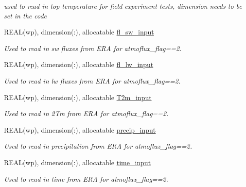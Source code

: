 \begin{DoxyCompactItemize}
\begin{DoxyCompactList}\small\item\em used to read in top temperature for field experiment tests, dimension needs to be set in the code \item\end{DoxyCompactList}\item 
REAL(wp), dimension(:), allocatable \hyperlink{namespacemo__data_adbae909d2ce614966d3de6ae1eb558a0}{fl\_\-sw\_\-input}
\begin{DoxyCompactList}\small\item\em Used to read in sw fluxes from ERA for atmoflux\_\-flag==2. \item\end{DoxyCompactList}\item 
REAL(wp), dimension(:), allocatable \hyperlink{namespacemo__data_a2d2ccb1188895b74eb3e2742c6a82b4c}{fl\_\-lw\_\-input}
\begin{DoxyCompactList}\small\item\em Used to read in lw fluxes from ERA for atmoflux\_\-flag==2. \item\end{DoxyCompactList}\item 
REAL(wp), dimension(:), allocatable \hyperlink{namespacemo__data_a8795a47a232696bffa9fa64a1f06a420}{T2m\_\-input}
\begin{DoxyCompactList}\small\item\em Used to read in 2Tm from ERA for atmoflux\_\-flag==2. \item\end{DoxyCompactList}\item 
REAL(wp), dimension(:), allocatable \hyperlink{namespacemo__data_ae066ba3be89578a239547e88eaa6c45e}{precip\_\-input}
\begin{DoxyCompactList}\small\item\em Used to read in precipitation from ERA for atmoflux\_\-flag==2. \item\end{DoxyCompactList}\item 
REAL(wp), dimension(:), allocatable \hyperlink{namespacemo__data_af2146601cc78d09fe2b51e065684822b}{time\_\-input}
\begin{DoxyCompactList}\small\item\em Used to read in time from ERA for atmoflux\_\-flag==2. \item\end{DoxyCompactList}\item 

\end{DoxyCompactItemize}
